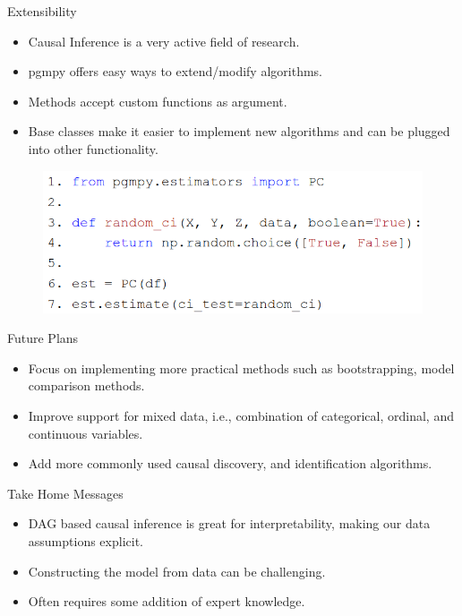 \documentclass[aspectratio=169]{beamer}
\begin{document}
\begin{frame}{Extensibility}
	\begin{itemize}
		\item Causal Inference is a very active field of research.
		\item pgmpy offers easy ways to extend/modify algorithms.
		\item Methods accept custom functions as argument.
		\item Base classes make it easier to implement new algorithms and can be plugged into other functionality.
	\end{itemize}
	\vspace{1em}
	\begin{figure}
		\centering
		\includegraphics[scale=0.3]{imgs/extend.png}
	\end{figure}
\end{frame}

\begin{frame}{Future Plans}
	\begin{itemize}
		\item Focus on implementing more practical methods such as bootstrapping, model comparison methods.
		\item Improve support for mixed data, i.e., combination of categorical, ordinal, and continuous variables.
		\item Add more commonly used causal discovery, and identification algorithms.
	\end{itemize}
\end{frame}

\begin{frame}{Take Home Messages}
	\begin{itemize}
		\item DAG based causal inference is great for interpretability, making 
			our data assumptions explicit.
		\item Constructing the model from data can be challenging.
		\item Often requires some addition of expert knowledge.
	\end{itemize}
\end{frame}
\end{document}
